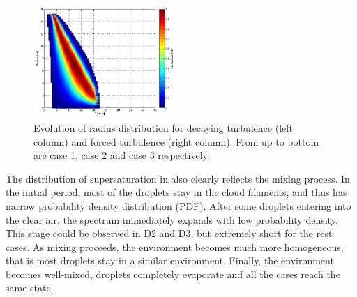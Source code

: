 \begin{figure}[h]
\includegraphics[width=0.48\textwidth]{Figures/pdf_radius_f3}
\caption{Evolution of radius distribution for decaying turbulence (left column)
and forced turbulence (right column). From up to bottom are case 1, case 2 and
case 3 respectively.}\label{fig:rad_distri} \end{figure}

The distribution of supersaturation in  also clearly
reflects the mixing process. In the initial period, most of the droplets stay
in the cloud filaments, and thus has narrow probability density distribution
(PDF). After some droplets entering into the clear air, the spectrum
immediately expands with low probability density. This stage could be observed
in D2 and D3, but extremely short for the rest cases. As mixing proceeds, the
environment becomes much more homogeneous, that is most droplets stay in a
similar environment. Finally, the environment becomes well-mixed, droplets
completely evaporate and all the cases reach the same state.

